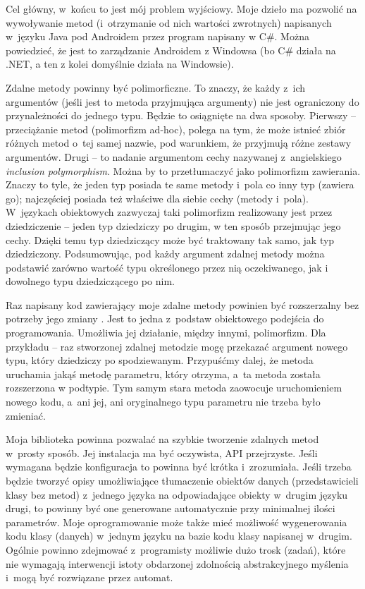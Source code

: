\begin{description}
Cel główny, w~końcu to jest mój problem wyjściowy. Moje dzieło ma pozwolić na wywoływanie metod (i~otrzymanie od nich wartości zwrotnych) napisanych w~języku Java pod Androidem przez program napisany w C\#. Można powiedzieć, że jest to zarządzanie Androidem z Windowsa (bo C\# działa na .NET, a ten z kolei domyślnie działa na Windowsie).

Zdalne metody powinny być polimorficzne. To znaczy, że każdy z~ich argumentów (jeśli jest to metoda przyjmująca argumenty) nie jest ograniczony do przynależności do jednego typu\cite{polymorphism}. Będzie to osiągnięte na dwa sposoby. Pierwszy -- przeciążanie metod (polimorfizm ad-hoc), polega na tym, że może istnieć zbiór różnych metod o~tej samej nazwie, pod warunkiem, że przyjmują różne zestawy argumentów. Drugi -- to nadanie argumentom cechy nazywanej z~angielskiego \emph{inclusion polymorphism}. Można by to przetłumaczyć jako polimorfizm zawierania. Znaczy to tyle, że jeden typ posiada te same metody i~pola co inny typ (zawiera go); najczęściej posiada też właściwe dla siebie cechy (metody i~pola). W~językach obiektowych zazwyczaj taki polimorfizm realizowany jest przez dziedziczenie -- jeden typ dziedziczy po drugim, w ten sposób przejmując jego cechy. Dzięki temu typ dziedziczący może być traktowany tak samo, jak typ dziedziczony. Podsumowując, pod każdy argument zdalnej metody można podstawić zarówno wartość typu określonego przez nią oczekiwanego, jak i dowolnego typu dziedziczącego po nim.

Raz napisany kod zawierający moje zdalne metody powinien być rozszerzalny bez potrzeby jego zmiany \cite[str.~105]{design-patterns}. Jest to jedna z~podstaw obiektowego podejścia do programowania. Umożliwia jej działanie, między innymi, polimorfizm. Dla przykładu -- raz stworzonej zdalnej metodzie mogę przekazać argument nowego typu, który dziedziczy po spodziewanym. Przypuśćmy dalej, że metoda uruchamia jakąś metodę parametru, który otrzyma, a~ta metoda została rozszerzona w podtypie. Tym samym stara metoda zaowocuje uruchomieniem nowego kodu, a~ani jej, ani oryginalnego typu parametru nie trzeba było zmieniać.

Moja biblioteka powinna pozwalać na szybkie tworzenie zdalnych metod w~prosty sposób. Jej instalacja ma być oczywista, API przejrzyste. Jeśli wymagana będzie konfiguracja to powinna być krótka i~zrozumiała. Jeśli trzeba będzie tworzyć opisy umożliwiające tłumaczenie obiektów danych (przedstawicieli klasy bez metod) z~jednego języka na odpowiadające obiekty w~drugim języku drugi, to powinny być one generowane automatycznie przy minimalnej ilości parametrów. Moje oprogramowanie może także mieć możliwość wygenerowania kodu klasy (danych) w~jednym języku na bazie kodu klasy napisanej w~drugim. Ogólnie powinno zdejmować z~programisty możliwie dużo trosk (zadań), które nie wymagają interwencji istoty obdarzonej zdolnością abstrakcyjnego myślenia i~mogą być rozwiązane przez automat.


\end{description}
